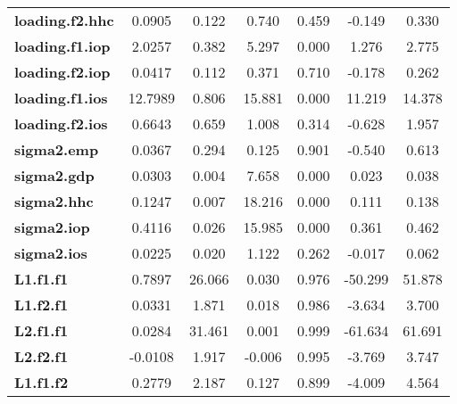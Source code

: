 \begin{center}
\begin{tabular}{lcccccc}
\textbf{loading.f2.hhc}   &       0.0905  &        0.122     &     0.740  &         0.459        &       -0.149    &        0.330     \\
\textbf{loading.f1.iop}   &       2.0257  &        0.382     &     5.297  &         0.000        &        1.276    &        2.775     \\
\textbf{loading.f2.iop}   &       0.0417  &        0.112     &     0.371  &         0.710        &       -0.178    &        0.262     \\
\textbf{loading.f1.ios}   &      12.7989  &        0.806     &    15.881  &         0.000        &       11.219    &       14.378     \\
\textbf{loading.f2.ios}   &       0.6643  &        0.659     &     1.008  &         0.314        &       -0.628    &        1.957     \\
\textbf{sigma2.emp}       &       0.0367  &        0.294     &     0.125  &         0.901        &       -0.540    &        0.613     \\
\textbf{sigma2.gdp}       &       0.0303  &        0.004     &     7.658  &         0.000        &        0.023    &        0.038     \\
\textbf{sigma2.hhc}       &       0.1247  &        0.007     &    18.216  &         0.000        &        0.111    &        0.138     \\
\textbf{sigma2.iop}       &       0.4116  &        0.026     &    15.985  &         0.000        &        0.361    &        0.462     \\
\textbf{sigma2.ios}       &       0.0225  &        0.020     &     1.122  &         0.262        &       -0.017    &        0.062     \\
\textbf{L1.f1.f1}         &       0.7897  &       26.066     &     0.030  &         0.976        &      -50.299    &       51.878     \\
\textbf{L1.f2.f1}         &       0.0331  &        1.871     &     0.018  &         0.986        &       -3.634    &        3.700     \\
\textbf{L2.f1.f1}         &       0.0284  &       31.461     &     0.001  &         0.999        &      -61.634    &       61.691     \\
\textbf{L2.f2.f1}         &      -0.0108  &        1.917     &    -0.006  &         0.995        &       -3.769    &        3.747     \\
\textbf{L1.f1.f2}         &       0.2779  &        2.187     &     0.127  &         0.899        &       -4.009    &        4.564     \\

\end{tabular}
\end{center}
